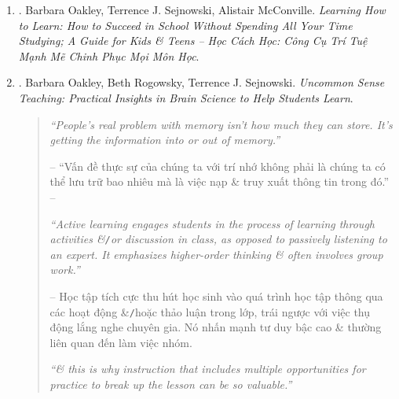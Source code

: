 \documentclass[12pt]{article}
\begin{document}
\begin{enumerate}
\begin{quotation}
		{\it``Diffuse mode is when your mind is relaxed \& free. You're thinking about nothing in particular.''}
		
		-- Chế độ khuếch tán là khi tâm trí bạn được thư giãn \& tự do. Bạn đang không nghĩ về điều gì đặc biệt cả.
		
		{\it``When you're using your focused mode, it means that you're paying attention.''}
		
		-- Khi bạn đang sử dụng chế độ tập trung, điều đó có nghĩa là bạn đang chú ý.
	\end{quotation}
	Với bản dịch tiếng Việt:
	\item \cite{Oakley_Sejnowski_McConville_learn_how_learn_VN}. {\sc Barbara Oakley, Terrence J. Sejnowski, Alistair McConville}. {\it Learning How to Learn: How to Succeed in School Without Spending All Your Time Studying; A Guide for Kids \& Teens -- Học Cách Học: Công Cụ Trí Tuệ Mạnh Mẽ Chinh Phục Mọi Môn Học}.
	\item \cite{Oakley_Rogowsky_Sejnowski_McConville_uncommon_sense_teaching}. {\sc Barbara Oakley, Beth Rogowsky, Terrence J. Sejnowski}. {\it Uncommon Sense Teaching: Practical Insights in Brain Science to Help Students Learn}.
	\begin{quotation}
		{\it``People's real problem with memory isn't how much they can store. It's getting the information into or out of memory.''}
		
		-- ``Vấn đề thực sự của chúng ta với trí nhớ không phải là chúng ta có thể lưu trữ bao nhiêu mà là việc nạp \& truy xuất thông tin trong đó.'' -- \cite[p. 19]{Oakley_Rogowsky_Sejnowski_McConville_uncommon_sense_teaching_VN}
		
		{\it``Active learning engages students in the process of learning through activities \&{\tt/}or discussion in class, as opposed to passively listening to an expert. It emphasizes higher-order thinking \& often involves group work.''}
		
		-- Học tập tích cực thu hút học sinh vào quá trình học tập thông qua các hoạt động \&{\tt/}hoặc thảo luận trong lớp, trái ngược với việc thụ động lắng nghe chuyên gia. Nó nhấn mạnh tư duy bậc cao \& thường liên quan đến làm việc nhóm.
		
		{\it``\& this is why instruction that includes multiple opportunities for practice to break up the lesson can be so valuable.''}
		

\end{quotation}
\end{enumerate}
\end{document}
